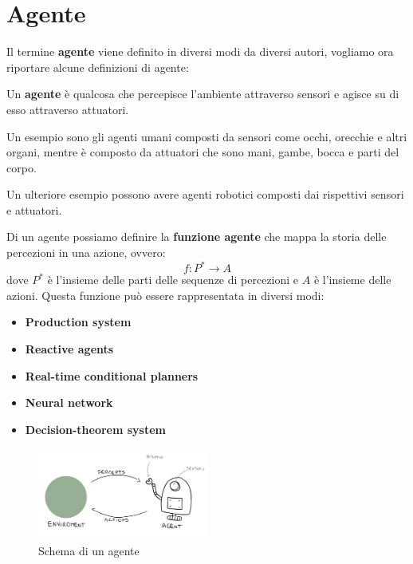 \section{Agente}
Il termine \textbf{agente} viene definito in diversi modi da diversi autori,
vogliamo ora riportare alcune definizioni di agente:
\begin{definizione}
    Un \textbf{agente} è qualcosa che percepisce l'ambiente attraverso sensori e
    agisce su di esso attraverso attuatori.
\end{definizione}
\begin{esempio}
    Un esempio sono gli agenti umani composti da sensori come occhi, orecchie e
    altri organi, mentre è composto da attuatori che sono mani, gambe, bocca e
    parti del corpo.

    Un ulteriore esempio possono avere agenti robotici composti dai rispettivi
    sensori e attuatori.
\end{esempio}
Di un agente possiamo definire la \textbf{funzione agente} che mappa la storia
delle percezioni in una azione, ovvero:
\begin{equation}
    f: P^* \rightarrow A
\end{equation}
dove $P^*$ è l'insieme delle parti delle sequenze di percezioni e $A$ è l'insieme
delle azioni. Questa funzione può essere rappresentata in diversi modi:
\begin{itemize}
    \item \textbf{Production system}
    \item \textbf{Reactive agents}
    \item \textbf{Real-time conditional planners}
    \item \textbf{Neural network}
    \item \textbf{Decision-theorem system}
\end{itemize}
\begin{figure}[!ht]
    \centering
    \includegraphics[width=0.5\textwidth]{./img/Agenti/AgenteEAmbiente.png}
    \caption{Schema di un agente}
    \label{fig:agenti}
\end{figure}

